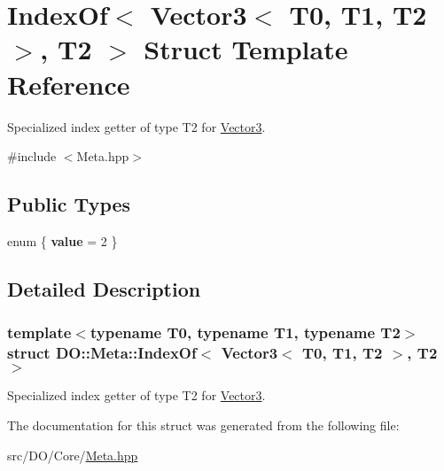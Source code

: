 \hypertarget{struct_d_o_1_1_meta_1_1_index_of_3_01_vector3_3_01_t0_00_01_t1_00_01_t2_01_4_00_01_t2_01_4}{\section{Index\-Of$<$ Vector3$<$ T0, T1, T2 $>$, T2 $>$ Struct Template Reference}
\label{struct_d_o_1_1_meta_1_1_index_of_3_01_vector3_3_01_t0_00_01_t1_00_01_t2_01_4_00_01_t2_01_4}
}


Specialized index getter of type T2 for \hyperlink{struct_d_o_1_1_meta_1_1_vector3}{Vector3}.  




{\ttfamily \#include $<$Meta.\-hpp$>$}

\subsection*{Public Types}
\begin{DoxyCompactItemize}
\item 
enum \{ {\bfseries value} = 2
 \}
\end{DoxyCompactItemize}


\subsection{Detailed Description}
\subsubsection*{template$<$typename T0, typename T1, typename T2$>$struct D\-O\-::\-Meta\-::\-Index\-Of$<$ Vector3$<$ T0, T1, T2 $>$, T2 $>$}

Specialized index getter of type T2 for \hyperlink{struct_d_o_1_1_meta_1_1_vector3}{Vector3}. 

The documentation for this struct was generated from the following file\-:\begin{DoxyCompactItemize}
\item 
src/\-D\-O/\-Core/\hyperlink{_meta_8hpp}{Meta.\-hpp}\end{DoxyCompactItemize}
